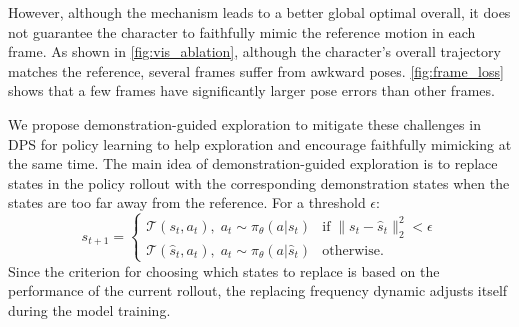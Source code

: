 However, although the mechanism leads to a better global optimal overall, it does not guarantee the character to faithfully mimic the reference motion in each frame. As shown in \autoref{fig:vis_ablation}, although the character's overall trajectory matches the reference, several frames suffer from awkward poses. \autoref{fig:frame_loss} shows that a few frames have significantly larger pose errors than other frames.

We propose demonstration-guided exploration to mitigate these challenges in DPS for policy learning to help exploration and encourage faithfully mimicking at the same time. The main idea of demonstration-guided exploration is to replace states in the policy rollout with the corresponding demonstration states when the states are too far away from the reference. For a threshold $\epsilon$:
\begin{equation}
  s_{t+1} =
    \begin{cases}
      \mathcal{T}(s_{t}, a_t), \; a_t \sim \pi_{\theta}(a|s_{t}) & \text{if} \; \|s_t-\hat{s}_t\|_2^2 < \epsilon \\
      \mathcal{T}(\hat{s}_{t}, a_t), \; a_t \sim \pi_{\theta}(a|\hat{s}_{t}) & \text{otherwise.}
    \end{cases}       
\end{equation}   
Since the criterion for choosing which states to replace is based on the performance of the current rollout, the replacing frequency dynamic adjusts itself during the model training.




